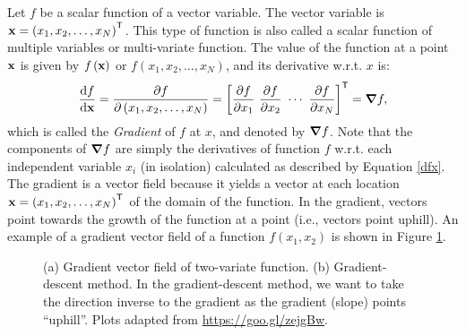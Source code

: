 \documentclass[12pt,letter]{article}
\begin{document}
Let $f$ be a scalar function of a vector variable. The vector variable is ${\bf x} = \left(x_1, x_2, \dots, x_N\right)^\mathsf{T}$. This type of function is also called a scalar function of multiple variables or multi-variate function. The value of the function at a point ${\bf x}$ is given by $f\left({\bf x}\right)$ or  $f\left(x_1, x_2, \dots, x_N\right)$, and its derivative w.r.t. $x$ is: 
\begin{align}
        \dv{f}{\bf x} = \pdv{f}{\left(x_1, x_2, \dots, x_N\right)} = \left[ \pdv{f}{x_1}\,\,  \pdv{f}{x_2}\,\, \cdots \,\,\pdv{f}{x_N}\right]^\mathsf{T}  =  \grad f, 
	\label{gradient}
\end{align}	
which is called the {\em Gradient} of $f$ at $x$, and denoted by $\grad f$. Note that the components of $ \grad f$ are simply the derivatives of function $f$ w.r.t. each independent variable $x_i$ (in isolation) calculated as described by Equation \ref{dfx}. The gradient is a vector field because it yields a vector at each location ${\bf x} = \left(x_1, x_2, \dots, x_N\right)^\mathsf{T}$ of the domain of the function. In the gradient, vectors point towards the growth of the function at a point (i.e., vectors point uphill). An example of a gradient vector field of a function $f(x_1,x_2)$ is shown in Figure \ref{fig_grad}. 
\begin{figure}[ht]
	\begin{center}
	\end{center}
	\caption{(a) Gradient vector field of two-variate function. (b) Gradient-descent method. In the gradient-descent method, we want to take the direction inverse to the gradient as the gradient (slope) points ``uphill''. Plots adapted from \url{https://goo.gl/zejgBw}.}
	\label{fig_grad}
\end{figure}
\end{document}
